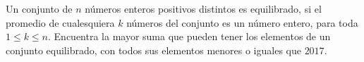 Un conjunto de $n$ números enteros positivos distintos es equilibrado, si el promedio de
cualesquiera $k$ números del conjunto es un número entero, para toda $1 \leq k \leq n$. Encuentra
la mayor suma que pueden tener los elementos de un conjunto equilibrado, con todos sus
elementos menores o iguales que $2017$.